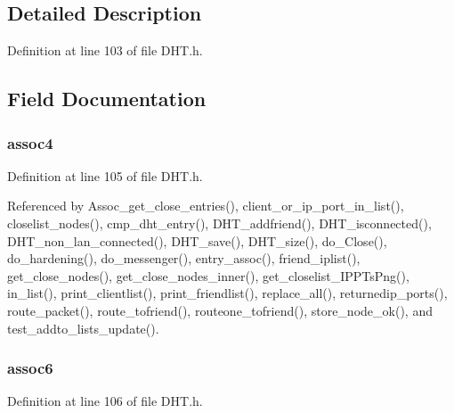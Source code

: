 \subsection{Detailed Description}


Definition at line 103 of file D\+H\+T.\+h.



\subsection{Field Documentation}
\hypertarget{struct_client__data_ac9843379cbcd02bdfa5c180a1474a6c5}{
\subsubsection[{assoc4}]{ assoc4}}\label{struct_client__data_ac9843379cbcd02bdfa5c180a1474a6c5}


Definition at line 105 of file D\+H\+T.\+h.



Referenced by Assoc\+\_\+get\+\_\+close\+\_\+entries(), client\+\_\+or\+\_\+ip\+\_\+port\+\_\+in\+\_\+list(), closelist\+\_\+nodes(), cmp\+\_\+dht\+\_\+entry(), D\+H\+T\+\_\+addfriend(), D\+H\+T\+\_\+isconnected(), D\+H\+T\+\_\+non\+\_\+lan\+\_\+connected(), D\+H\+T\+\_\+save(), D\+H\+T\+\_\+size(), do\+\_\+\+Close(), do\+\_\+hardening(), do\+\_\+messenger(), entry\+\_\+assoc(), friend\+\_\+iplist(), get\+\_\+close\+\_\+nodes(), get\+\_\+close\+\_\+nodes\+\_\+inner(), get\+\_\+closelist\+\_\+\+I\+P\+P\+Ts\+Png(), in\+\_\+list(), print\+\_\+clientlist(), print\+\_\+friendlist(), replace\+\_\+all(), returnedip\+\_\+ports(), route\+\_\+packet(), route\+\_\+tofriend(), routeone\+\_\+tofriend(), store\+\_\+node\+\_\+ok(), and test\+\_\+addto\+\_\+lists\+\_\+update().

\hypertarget{struct_client__data_a87d394929a2604f6f785fec949fac618}{
\subsubsection[{assoc6}]{ assoc6}}\label{struct_client__data_a87d394929a2604f6f785fec949fac618}


Definition at line 106 of file D\+H\+T.\+h.




